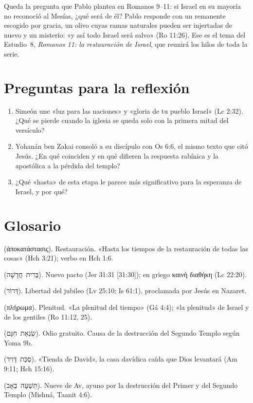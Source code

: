 \documentclass[11pt,letterpaper]{article}
\newcommand{\heb}[1]{\mbox{\foreignlanguage{hebrew}{#1}}}
\newcommand{\grc}[1]{\foreignlanguage{ancientgreek}{#1}}
\begin{document}
Queda la pregunta que Pablo plantea en Romanos 9--11: si Israel en su mayoría no reconoció al Mesías, ¿qué será de él? Pablo responde con un remanente escogido por gracia, un olivo cuyas ramas naturales pueden ser injertadas de nuevo y un misterio: «y así todo Israel será salvo» (Ro 11:26). Ese es el tema del Estudio~8, \emph{Romanos 11: la restauración de Israel}, que reunirá los hilos de toda la serie.

\section*{Preguntas para la reflexión}
\begin{enumerate}
\item Simeón une «luz para las naciones» y «gloria de tu pueblo Israel» (Lc 2:32). ¿Qué se pierde cuando la iglesia se queda solo con la primera mitad del versículo?
\item Yohanán ben Zakai consoló a su discípulo con Os 6:6, el mismo texto que citó Jesús. ¿En qué coinciden y en qué difieren la respuesta rabínica y la apostólica a la pérdida del templo?
\item ¿Qué «hasta» de esta etapa le parece más significativo para la esperanza de Israel, y por qué?
\end{enumerate}

\section*{Glosario}
\begin{description}\small
\item[Apokatástasis] (\grc{ἀποκατάστασις}). Restauración. «Hasta los tiempos de la restauración de todas las cosas» (Hch 3:21); verbo en Hch 1:6.
\item[Brit jadashá] (\heb{בְּרִית חֲדָשָׁה}). Nuevo pacto (Jer 31:31 [31:30]); en griego \grc{καινὴ διαθήκη} (Lc 22:20).
\item[Derór] (\heb{דְּרוֹר}). Libertad del jubileo (Lv 25:10; Is 61:1), proclamada por Jesús en Nazaret.
\item[Pléroma] (\grc{πλήρωμα}). Plenitud. «La plenitud del tiempo» (Gá 4:4); «la plenitud» de Israel y de los gentiles (Ro 11:12, 25).
\item[Sinat jinam] (\heb{שִׂנְאַת חִנָּם}). Odio gratuito. Causa de la destrucción del Segundo Templo según Yoma 9b.
\item[Sukkat David] (\heb{סֻכַּת דָּוִיד}). «Tienda de David», la casa davídica caída que Dios levantará (Am 9:11; Hch 15:16).
\item[Tisha be-Av] (\heb{תִּשְׁעָה בְּאָב}). Nueve de Av, ayuno por la destrucción del Primer y del Segundo Templo (Mishná, Taanit 4:6).
\end{description}
\end{document}

